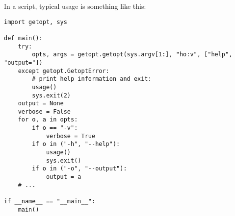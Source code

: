 In a script, typical usage is something like this:

\begin{verbatim}
import getopt, sys

def main():
    try:
        opts, args = getopt.getopt(sys.argv[1:], "ho:v", ["help", "output="])
    except getopt.GetoptError:
        # print help information and exit:
        usage()
        sys.exit(2)
    output = None
    verbose = False
    for o, a in opts:
        if o == "-v":
            verbose = True
        if o in ("-h", "--help"):
            usage()
            sys.exit()
        if o in ("-o", "--output"):
            output = a
    # ...

if __name__ == "__main__":
    main()
\end{verbatim}

\begin{seealso}
\end{seealso}
